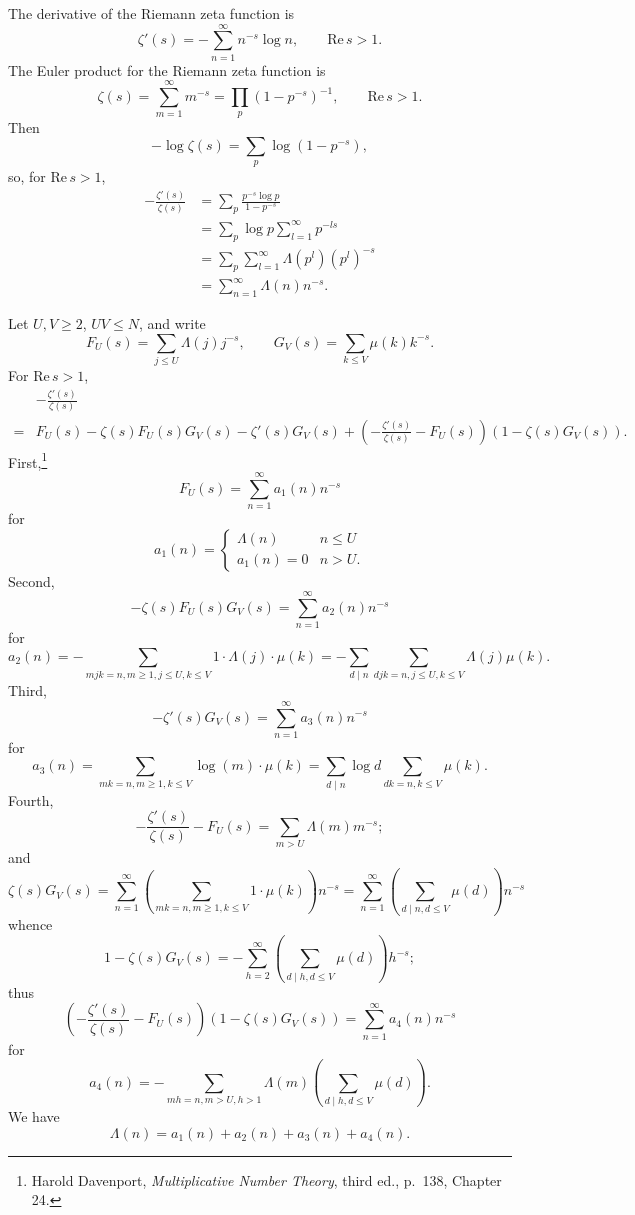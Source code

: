 \documentclass{article}
\def\Re{\ensuremath{\mathrm{Re}}\,}
\theoremstyle{definition}
\begin{document}
The derivative of the Riemann zeta function is
\[
\zeta'(s) =- \sum_{n=1}^\infty n^{-s} \log n,\qquad \Re s>1.
\]
The Euler product for the Riemann zeta function is 
\[
\zeta(s) = \sum_{m=1}^\infty m^{-s} = \prod_p (1-p^{-s})^{-1},\qquad \Re s>1.
\]
Then
\[
-\log \zeta(s) = \sum_p \log(1-p^{-s}), 
\]
so, for $\Re s>1$,
\begin{align*}
-\frac{\zeta'(s)}{\zeta(s)} &= \sum_p \frac{p^{-s} \log p}{1-p^{-s}}\\
&=\sum_p \log p \sum_{l=1}^\infty p^{-ls}\\
&=\sum_p \sum_{l=1}^\infty   \Lambda(p^l) (p^l)^{-s}\\
&=\sum_{n=1}^\infty \Lambda(n) n^{-s}.
\end{align*}

Let $U,V \geq 2$, $UV \leq N$, and
write
\[
F_U(s) = \sum_{j \leq U} \Lambda(j)j^{-s}, \qquad G_V(s) = \sum_{k \leq V} \mu(k) k^{-s}.
\]
For $\Re s>1$,
\[
\begin{split}
&-\frac{\zeta'(s)}{\zeta(s)}\\
=& F_U(s)-\zeta(s) F_U(s) G_V(s) - \zeta'(s) G_V(s)+\left(-\frac{\zeta'(s)}{\zeta(s)} - F_U(s) \right) (1-\zeta(s) G_V(s)).
\end{split}
\]
First,\footnote{Harold Davenport, {\em Multiplicative Number Theory}, third ed., p.~138, Chapter 24.}
\[
F_U(s) = \sum_{n=1}^\infty a_1(n) n^{-s}
\]
for
\[
a_1(n) =\begin{cases}
\Lambda(n)&n \leq U\\
a_1(n)=0&n > U.
\end{cases}
\]
Second,
\[
-\zeta(s) F_U(s) G_V(s) = \sum_{n=1}^\infty a_2(n) n^{-s}
\]
for
\[
a_2(n) =- \sum_{m jk=n, m \geq 1, j \leq U, k \leq V} 1 \cdot \Lambda(j) \cdot \mu(k)=
-\sum_{d \mid n} \sum_{djk=n, j \leq U, k \leq V} \Lambda(j) \mu(k).
\]
Third,
\[
-\zeta'(s) G_V(s) = \sum_{n=1}^\infty a_3(n) n^{-s}
\]
for
\[
a_3(n) = \sum_{mk=n, m\geq 1, k \leq V} \log(m) \cdot \mu(k) = \sum_{d \mid n} \log d \sum_{dk=n, k \leq V} \mu(k).
\]
Fourth,
\[
-\frac{\zeta'(s)}{\zeta(s)} - F_U(s) = \sum_{m>U} \Lambda(m) m^{-s};
\]
and
\[
\zeta(s) G_V(s) = \sum_{n=1}^\infty \left( \sum_{mk=n, m\geq 1, k \leq V} 1 \cdot \mu(k) \right) n^{-s}
=\sum_{n=1}^\infty \left( \sum_{d \mid n, d \leq V} \mu(d) \right) n^{-s}
\]
whence
\[
1-\zeta(s) G_V(s) =- \sum_{h=2}^\infty  \left( \sum_{d \mid h, d \leq V} \mu(d) \right) h^{-s};
\]
thus
\[
\left(-\frac{\zeta'(s)}{\zeta(s)} - F_U(s) \right) (1-\zeta(s) G_V(s)) = \sum_{n=1}^\infty a_4(n) n^{-s}
\]
for
\[
a_4(n) = -\sum_{mh=n, m>U, h>1} \Lambda(m)  \left( \sum_{d \mid h, d \leq V} \mu(d) \right).
\]
We have
\[
\Lambda(n) = a_1(n) + a_2(n) + a_3(n) + a_4(n).
\]
\end{document}
